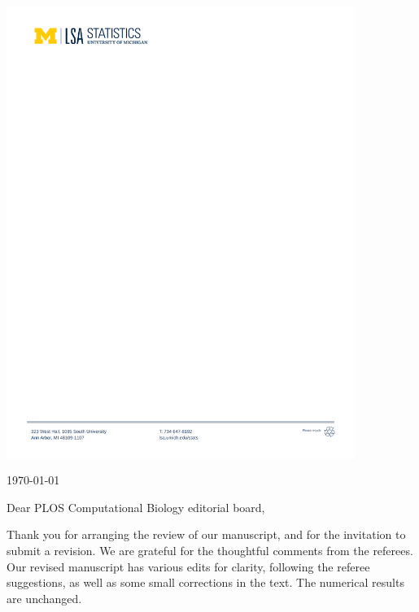 \documentclass[11pt]{article}
\begin{document}
\rule{0cm}{0.3cm}

\vspace{-8mm}

\includegraphics[width=0.85\textwidth,trim={1.7cm 25.6cm 10cm 1.3cm},clip]{umich-stat-letterhead-2019.pdf}

\vspace{10mm}

\begin{flushright}
\today
\end{flushright}



\vspace{5mm}

Dear PLOS Computational Biology editorial board,

Thank you for arranging the review of our manuscript, and for the invitation to submit a revision.
We are grateful for the thoughtful comments from the referees.
Our revised manuscript has various edits for clarity, following the referee suggestions, as well as some small corrections in the text.
The numerical results are unchanged.
\end{document}
